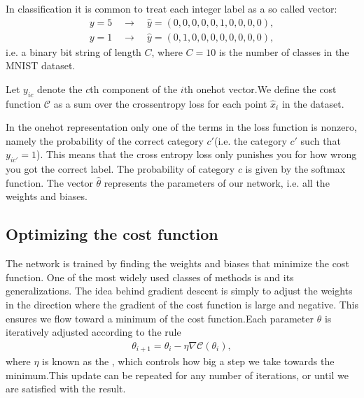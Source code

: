 \documentclass[letterpaper,10pt,english]{sphinxmanual}
\begin{document}
In  classification it is common to treat each integer label as a so called  vector:
\begin{equation*}
\begin{split} y = 5 \quad \rightarrow \quad \hat{y} = (0, 0, 0, 0, 0, 1, 0, 0, 0, 0) ,\end{split}
\end{equation*}\begin{equation*}
\begin{split} y = 1 \quad \rightarrow \quad \hat{y} = (0, 1, 0, 0, 0, 0, 0, 0, 0, 0) ,\end{split}
\end{equation*}
i.e. a binary bit string of length \(C\), where \(C = 10\) is the number of classes in the MNIST dataset.

Let \(y_{ic}\) denote the \(c\)\sphinxhyphen{}th component of the \(i\)\sphinxhyphen{}th one\sphinxhyphen{}hot vector.We define the cost function \(\mathcal{C}\) as a sum over the cross\sphinxhyphen{}entropy loss for each point \(\hat{x}_i\) in the dataset.

In the one\sphinxhyphen{}hot representation only one of the terms in the loss function is non\sphinxhyphen{}zero, namely the
probability of the correct category \(c'\)(i.e. the category \(c'\) such that \(y_{ic'} = 1\)). This means that the cross entropy loss only punishes you for how wrong
you got the correct label. The probability of category \(c\) is given by the softmax function. The vector \(\hat{\theta}\) represents the parameters of our network, i.e. all the weights and biases.


\subsection{Optimizing the cost function}
\label{\detokenize{chapter6:optimizing-the-cost-function}}
The network is trained by finding the weights and biases that minimize the cost function. One of the most widely used classes of methods is  and its generalizations. The idea behind gradient descent
is simply to adjust the weights in the direction where the gradient of the cost function is large and negative. This ensures we flow toward a  minimum of the cost function.Each parameter \(\theta\) is iteratively adjusted according to the rule
\begin{equation*}
\begin{split} \theta_{i+1} = \theta_i - \eta \nabla \mathcal{C}(\theta_i) ,\end{split}
\end{equation*}
where \(\eta\) is known as the , which controls how big a step we take towards the minimum.This update can be repeated for any number of iterations, or until we are satisfied with the result.
\end{document}
